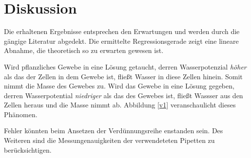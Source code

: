 \documentclass[11pt,a4paper,DIV=10,]{scrartcl}
\begin{document}
\section*{Diskussion}
Die erhaltenen Ergebnisse entsprechen den Erwartungen und werden durch die gängige Literatur abgedekt. Die ermittelte Regressionsgerade zeigt eine lineare Abnahme, die theoretisch so zu erwarten gewesen ist. 

Wird pflanzliches Gewebe in eine Lösung getaucht, derren Wasserpotenzial \textit{höher} als das der Zellen in dem Gewebe ist, fließt Wasser in diese Zellen hinein. Somit nimmt die Masse des Gewebes zu. Wird das Gewebe in eine Lösung gegeben, derren Wasserpotential \textit{niedriger} als das des Gewebes ist, fließt Wassser aus den Zellen heraus und die Masse nimmt ab. Abbildung \ref{v1} veranschaulicht dieses Phänomen. 

Fehler könnten beim Ansetzen der Verdünnungsreihe enstanden sein. Des Weiteren sind die
Messungenauigkeiten der verwendeteten Pipetten zu berücksichtigen. 
\end{document}
